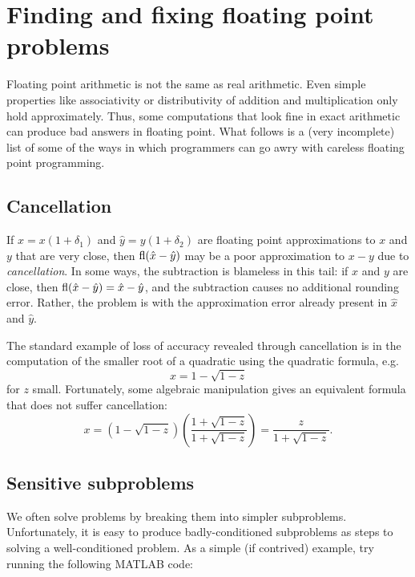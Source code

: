 \documentclass[12pt, leqno]{article} %
\begin{document}

\section{Finding and fixing floating point problems}

Floating point arithmetic is not the same as real arithmetic.  Even
simple properties like associativity or distributivity of addition and
multiplication only hold approximately.  Thus, some computations that
look fine in exact arithmetic can produce bad answers in floating
point.  What follows is a (very incomplete) list of some of the ways
in which programmers can go awry with careless floating point
programming.

\subsection{Cancellation}

If $\hat{x} = x(1+\delta_1)$ and $\hat{y} = y(1+\delta_2)$ are
floating point approximations to $x$ and $y$ that are very close, then
$\operatorname{fl}(\hat{x}-\hat{y})$ may be a poor approximation to $x-y$ due to
{\em cancellation}.  In some ways, the subtraction is blameless in
this tail: if $x$ and $y$ are close, then $\operatorname{fl}(\hat{x}-\hat{y}) =
\hat{x}-\hat{y}$, and the subtraction causes no additional rounding
error.  Rather, the problem is with the approximation error already
present in $\hat{x}$ and $\hat{y}$.

The standard example of loss of accuracy revealed through cancellation
is in the computation of the smaller root of a quadratic using the
quadratic formula, e.g.
\[
  x = 1-\sqrt{1-z}
\]
for $z$ small.  Fortunately, some algebraic manipulation gives an
equivalent formula that does not suffer cancellation:
\[
  x =
    \left( 1-\sqrt{1-z} \right)
    \left(\frac{1+\sqrt{1-z}}{1+\sqrt{1-z}}\right)
  =
    \frac{z}{1+\sqrt{1-z}}.
\]

\subsection{Sensitive subproblems}

We often solve problems by breaking them into simpler subproblems.
Unfortunately, it is easy to produce badly-conditioned subproblems
as steps to solving a well-conditioned problem.  As a simple (if
contrived) example, try running the following MATLAB code:


\end{document}
